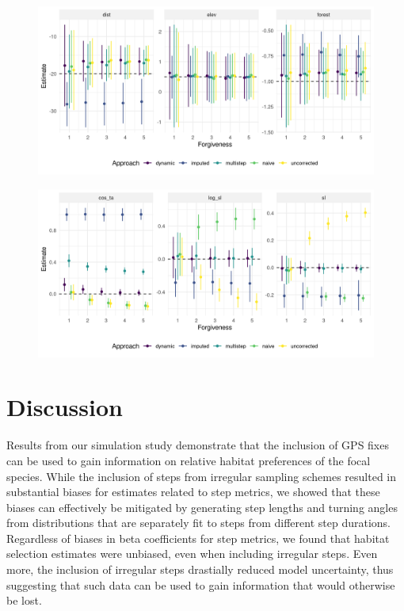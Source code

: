 \documentclass[abstract=on,10pt,a4paper,bibliography=totocnumbered]{article}
\begin{document}
\begin{figure}
  \begin{center}
  \includegraphics[width = \textwidth]{99_ResultsHabitatKernel.png}
  \caption{}
  \label{ResultsHabitat}
  \end{center}
\end{figure}

\begin{figure}
  \begin{center}
  \includegraphics[width = \textwidth]{99_ResultsMovementKernel.png}
  \caption{}
  \label{ResultsMovement}
  \end{center}
\end{figure}


\section{Discussion}
Results from our simulation study demonstrate that the inclusion of GPS fixes
can be used to gain information on relative habitat preferences of the focal
species. While the inclusion of steps from irregular sampling schemes resulted
in substantial biases for estimates related to step metrics, we showed that
these biases can effectively be mitigated by generating step lengths and turning
angles from distributions that are separately fit to steps from different step
durations. Regardless of biases in beta coefficients for step metrics, we found
that habitat selection estimates were unbiased, even when including irregular
steps. Even more, the inclusion of irregular steps drastially reduced model
uncertainty, thus suggesting that such data can be used to gain information that
would otherwise be lost.
\end{document}
